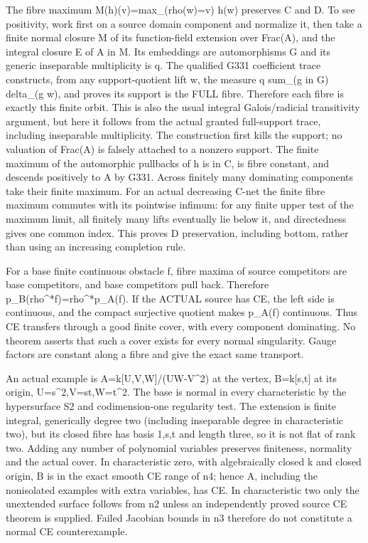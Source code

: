 \documentclass[11pt]{article}
\begin{document}
The fibre maximum M(h)(v)=max\_(rho(w)=v) h(w) preserves C and D. To see positivity, work first on a source domain component and normalize it, then take a finite normal closure M of its function-field extension over Frac(A), and the integral closure E of A in M. Its embeddings are automorphisms G and its generic inseparable multiplicity is q. The qualified G331 coefficient trace constructs, from any support-quotient lift w, the measure q sum\_(g in G) delta\_(g w), and proves its support is the FULL fibre. Therefore each fibre is exactly this finite orbit. This is also the usual integral Galois/radicial transitivity argument, but here it follows from the actual granted full-support trace, including inseparable multiplicity. The construction first kills the support; no valuation of Frac(A) is falsely attached to a nonzero support. The finite maximum of the automorphic pullbacks of h is in C, is fibre constant, and descends positively to A by G331. Across finitely many dominating components take their finite maximum. For an actual decreasing C-net the finite fibre maximum commutes with its pointwise infimum: for any finite upper test of the maximum limit, all finitely many lifts eventually lie below it, and directedness gives one common index. This proves D preservation, including bottom, rather than using an increasing completion rule.

For a base finite continuous obstacle f, fibre maxima of source competitors are base competitors, and base competitors pull back. Therefore p\_B(rho\textasciicircum{}*f)=rho\textasciicircum{}*p\_A(f). If the ACTUAL source has CE, the left side is continuous, and the compact surjective quotient makes p\_A(f) continuous. Thus CE transfers through a good finite cover, with every component dominating. No theorem asserts that such a cover exists for every normal singularity. Gauge factors are constant along a fibre and give the exact same transport.

An actual example is A=k[U,V,W]/(UW-V\textasciicircum{}2) at the vertex, B=k[s,t] at its origin, U=s\textasciicircum{}2,V=st,W=t\textasciicircum{}2. The base is normal in every characteristic by the hypersurface S2 and codimension-one regularity test. The extension is finite integral, generically degree two (including inseparable degree in characteristic two), but its closed fibre has basis 1,s,t and length three, so it is not flat of rank two. Adding any number of polynomial variables preserves finiteness, normality and the actual cover. In characteristic zero, with algebraically closed k and closed origin, B is in the exact smooth CE range of n4; hence A, including the nonisolated examples with extra variables, has CE. In characteristic two only the unextended surface follows from n2 unless an independently proved source CE theorem is supplied. Failed Jacobian bounds in n3 therefore do not constitute a normal CE counterexample.
\end{document}
